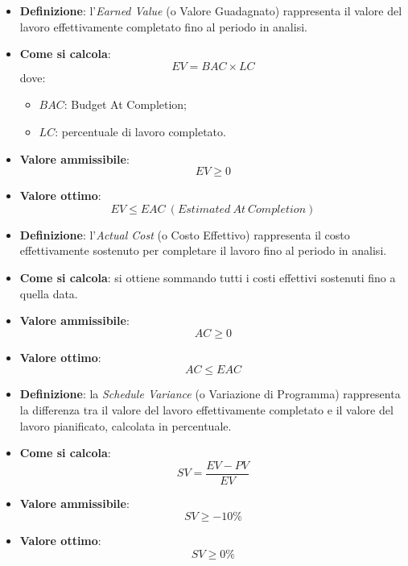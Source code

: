 \begin{itemize}
	\item \textbf{Definizione}: l'\textit{Earned Value} (o Valore Guadagnato) rappresenta il valore del lavoro effettivamente completato fino al periodo in analisi.
	\item \textbf{Come si calcola}: \begin{equation*}EV = BAC \times LC\end{equation*} dove:
		\begin{itemize}
			\item $BAC$: Budget At Completion;
			\item $LC$: percentuale di lavoro completato.
		\end{itemize}
	\item \textbf{Valore ammissibile}: \begin{equation*}EV \geq 0\end{equation*}
	\item \textbf{Valore ottimo}: \begin{equation*}EV \leq EAC\ (Estimated\ At\ Completion)\end{equation*}
\end{itemize}

\begin{itemize}
	\item \textbf{Definizione}: l'\textit{Actual Cost} (o Costo Effettivo) rappresenta il costo effettivamente sostenuto per completare il lavoro fino al periodo in analisi.
	\item \textbf{Come si calcola}: si ottiene sommando tutti i costi effettivi sostenuti fino a quella data.
	\item \textbf{Valore ammissibile}: \begin{equation*}AC \geq 0\end{equation*}
	\item \textbf{Valore ottimo}: \begin{equation*}AC \leq EAC\end{equation*}
\end{itemize}

\begin{itemize}
	\item \textbf{Definizione}: la \textit{Schedule Variance} (o Variazione di Programma) rappresenta la differenza tra il valore del lavoro effettivamente completato e il valore del lavoro pianificato, calcolata in percentuale.
	\item \textbf{Come si calcola}: \begin{equation*}SV = \frac{EV - PV}{EV}\end{equation*}
	\item \textbf{Valore ammissibile}: \begin{equation*}SV \geq -10\%\end{equation*}
	\item \textbf{Valore ottimo}: \begin{equation*}SV \geq 0\%\end{equation*}
\end{itemize}

